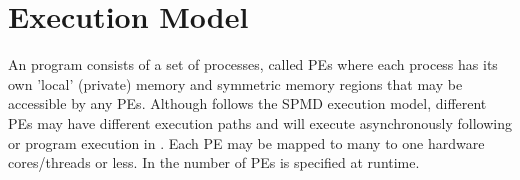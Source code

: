 %   
    

\section{Execution Model}
An \openshmem program consists of a set of processes, called \ac{PE}s where each process has its own 'local' (private) memory and symmetric memory regions that may be accessible by any \ac{PE}s.
Although \openshmem follows the SPMD execution model, different \ac{PE}s may have different execution paths and will execute asynchronously following \Fortran{} or program execution in \Clang. Each \ac{PE} may be mapped to many to one hardware cores/threads or less. In \openshmem the number of \ac{PE}s is specified at runtime.

